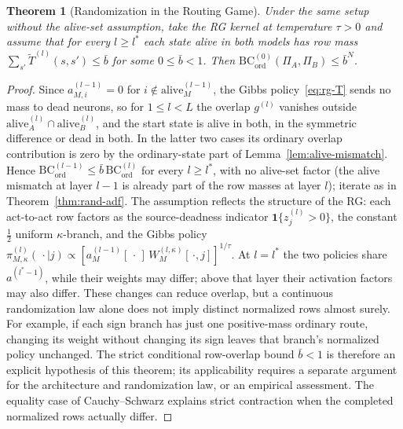 \documentclass[twoside]{article}
\newcommand{\1}{\mathbf{1}}
\newtheorem{theorem}{Theorem}
\begin{document}
\begin{theorem}[Randomization in the Routing Game]\label{thm:rand-routing}
Under the same setup without the alive-set assumption, take the \ac{RG} kernel at temperature $\tau
    > 0$ and assume that for every $l \geq l^*$ each state alive in both models has row mass
$\sum_{s'}\widetilde{T}^{(l)}(s, s') \leq \bar{b}$ for some $0 \leq \bar{b} < 1$.  Then
$\mathrm{BC}^{(0)}_{\mathrm{ord}}(\Pi_A, \Pi_B) \leq \bar{b}^{N}$.
\end{theorem}

\begin{proof}
Since $a^{(l-1)}_{M,i} = 0$ for $i \notin \mathrm{alive}^{(l-1)}_M$, the Gibbs
policy~\eqref{eq:rg-T} sends no mass to dead neurons, so for $1 \le l < L$ the overlap $g^{(l)}$
vanishes outside $\mathrm{alive}^{(l)}_A \cap \mathrm{alive}^{(l)}_B$, and the start state is alive
in both, in the symmetric difference or dead in both. In the latter two cases its
ordinary overlap contribution is zero by the ordinary-state part of Lemma~\ref{lem:alive-mismatch}. Hence
$\mathrm{BC}^{(l-1)}_{\mathrm{ord}} \leq \bar{b}\,\mathrm{BC}^{(l)}_{\mathrm{ord}}$ for every $l
    \geq l^*$, with no alive-set factor (the alive mismatch at layer $l-1$ is already part of the row
masses at layer $l$); iterate as in Theorem~\ref{thm:rand-adf}.  The assumption reflects the
structure of the \ac{RG}: each act-to-act row factors as the source-deadness indicator
$\1\{z_j^{(l)} > 0\}$, the constant $\tfrac12$ uniform $\kappa$-branch, and the Gibbs policy
$\pi_{M,\kappa}^{(l)}(\,\cdot\mid j) \propto [a^{(l-1)}_M[\,\cdot\,]\,W^{(l,\kappa)}_M[\,\cdot,
    j]]^{1/\tau}$.  At $l=l^*$ the two policies share $a^{(l^*-1)}$, while their weights may differ; above that layer their activation factors may also differ. These changes can reduce overlap, but a continuous randomization law alone does not imply distinct normalized rows almost surely. For example, if each sign branch has just one positive-mass ordinary route, changing its weight without changing its sign leaves that branch's normalized policy unchanged. The strict conditional row-overlap bound $\bar b<1$ is therefore an explicit hypothesis of this theorem; its applicability requires a separate argument for the architecture and randomization law, or an empirical assessment. The equality case of Cauchy--Schwarz explains strict contraction when the completed normalized rows actually differ.
\end{proof}
\end{document}
